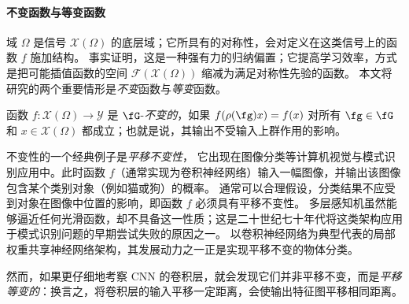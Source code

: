 \paragraph{不变函数与等变函数}

域 $\Omega$ 是信号 $\mathcal{X}(\Omega)$ 的底层域；它所具有的对称性，会对定义在这类信号上的函数 $f$ 施加结构。
%
事实证明，这是一种强有力的归纳偏置；它提高学习效率，方式是把可能插值函数的空间 $\mathcal{F}(\mathcal{X}(\Omega))$ 缩减为满足对称性先验的函数。
%
%
本文将研究的两个重要情形是{\em 不变}函数与{\em 等变}函数。




\begin{tcolorbox}[width=\linewidth,
                  boxsep=0pt,
                  left=7.5pt,
                  right=7.5pt,
                  top=7.5pt,
                  bottom=7.5pt,
                  arc=0pt,
                  boxrule=0pt,toprule=0pt,
                  colback=boxgray,
                  ]%
    函数 $f: \mathcal{X}(\Omega) \rightarrow \mathcal{Y}$ 是 $\fG$-{\em 不变的}，如果
    $
    f(\rho(\fg)x) = f(x)$ 对所有 $\fg \in \fG$ 和 $x \in \mathcal{X}(\Omega)$ 都成立；也就是说，其输出不受输入上群作用的影响。
\end{tcolorbox}


不变性的一个经典例子是{\em 平移不变性}，
它出现在图像分类等计算机视觉与模式识别应用中。此时函数 $f$（通常实现为卷积神经网络）输入一幅图像，并输出该图像包含某个类别对象（例如猫或狗）的概率。%
%
通常可以合理假设，分类结果不应受到对象在图像中位置的影响，即函数 $f$ 必须具有平移不变性。
%
多层感知机虽然能够逼近任何光滑函数，却不具备这一性质；这是二十世纪七十年代将这类架构应用于模式识别问题的早期尝试失败的原因之一。
%
以卷积神经网络为典型代表的局部权重共享神经网络架构，其发展动力之一正是实现平移不变的物体分类。


然而，如果更仔细地考察 CNN 的卷积层，就会发现它们并非平移不变，而是{\em 平移等变的}：换言之，将卷积层的输入平移一定距离，会使输出特征图平移相同距离。

